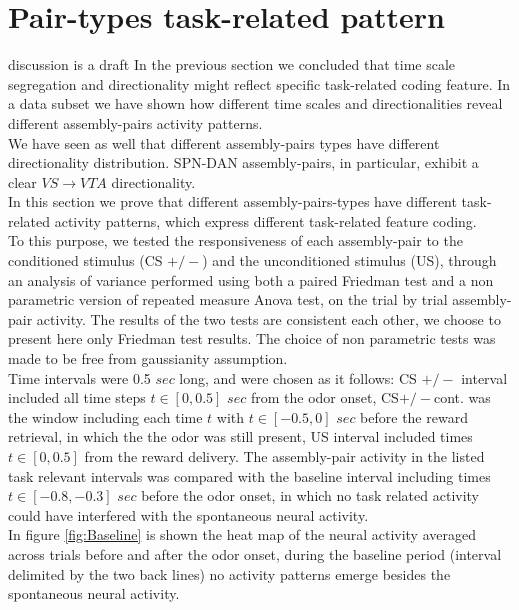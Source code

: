  \section{Pair-types task-related pattern}
 \label{sec:TaskResp}
 {\color{red}discussion is a draft}
In the previous section we concluded that time scale segregation and directionality might reflect specific task-related coding feature. In a data subset we have shown how different time scales and directionalities reveal different assembly-pairs activity patterns.\\We have seen as well that different assembly-pairs types have different directionality distribution. SPN-DAN assembly-pairs, in particular, exhibit a clear $VS\rightarrow VTA$ directionality.\\In this section we prove that different assembly-pairs-types have different task-related activity patterns, which express different task-related feature coding.\\
To this purpose, we tested the responsiveness of each assembly-pair to the conditioned stimulus (CS $+/-$) and the unconditioned stimulus (US), through an analysis of variance performed using both a paired Friedman test and a non parametric version of repeated measure Anova test, on the trial by trial assembly-pair activity. The results of the two tests are consistent each other, we choose to present here only Friedman test results.
The choice of non parametric tests was made to be free from gaussianity assumption.\\Time intervals were 0.5 $sec$ long, and were chosen as it follows: CS $+/-$ interval included all time steps $t \in [0, 0.5]$ $sec$ from the odor onset, CS$+/-$cont. was the window including each time $t$ with $t \in [-0.5, 0]$ $sec$ before the reward retrieval, in which the the odor was still present, US interval included times $t \in [0,0.5]$ from the reward delivery. The assembly-pair activity in the listed task relevant intervals was compared with the baseline interval including times $t \in [-0.8, -0.3]$ $sec$ before the odor onset, in which no task related activity could have interfered with the spontaneous neural activity.\\In figure \ref{fig:Baseline} is shown the heat map of the neural activity averaged across trials before and after the odor onset, during the baseline period (interval delimited by the two back lines) no activity patterns emerge besides the spontaneous neural activity.\\
